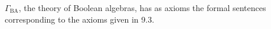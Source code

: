 $\Gamma_{\text{BA}}$, the theory of Boolean algebras, has as axioms the formal sentences corresponding to the axioms given in 9.3.

